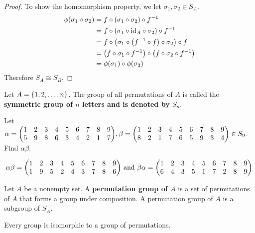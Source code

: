 \begin{proof}
    To show the homomorphism property, we let $\sigma_1, \sigma_2 \in S_A$.
    \begin{align*}
        \phi \qty(\sigma_1 \circ \sigma_2) &= f \circ \qty(\sigma_1 \circ \sigma_2) \circ f^{-1} \\
        &= f \circ \qty(\sigma_1 \circ \text{id}_A \circ \sigma_2) \circ f^{-1} \\
        &= f \circ \qty(\sigma_1 \circ \qty(f^{-1} \circ f) \circ \sigma_2) \circ f \\
        &= \qty(f \circ \sigma_1 \circ f^{-1}) \circ \qty(f \circ \sigma_2 \circ f^{-1}) \\
        &= \phi(\sigma_1) \circ \phi (\sigma_2)
    \end{align*}
    Therefore $S_A \cong S_B$. \qedsymbol
\end{proof}


\begin{definition}
    Let $A = \qty{1, 2, \ldots, n}$. The group of all permutations of $A$ is called the \textbf{symmetric group of $n$ letters and is denoted by $S_n$}.
\end{definition}

\begin{exercise}
    Let $\alpha = \mqty(1 & 2 & 3 & 4 & 5 & 6 & 7 & 8 & 9 \\ 5 & 9 & 8 & 6 & 3 & 4 & 2 & 1 & 7), \beta = \mqty(1 & 2 & 3 & 4 & 5 & 6 & 7 & 8 & 9 \\ 8 & 2 & 1 & 7 & 6 & 5 & 9 & 3 & 4) \in S_9$. Find $\alpha\beta$. 
\end{exercise}

\begin{solution}
    \[ \alpha \beta = \mqty(1 & 2 & 3 & 4 & 5 & 6 & 7 & 8 & 9 \\ 1 & 9 & 5 & 2 & 4 & 3 & 7 & 8 & 6 ) \text{ and } \beta \alpha  = \mqty(1 & 2 & 3 & 4 & 5 & 6 & 7 & 8 & 9 \\ 6 & 4 & 3 & 5 & 1 & 7 & 2 & 8 & 9  ) \]
\end{solution}

\begin{definition}
    Let $A$ be a nonempty set. A \textbf{permutation group of $A$} is a set of permutations of $A$ that forms a group under composition. A permutation group of $A$ is a subgroup of $S_A$.
\end{definition}

\begin{theorem}
    Every group is isomorphic to a group of permutations.
\end{theorem}

